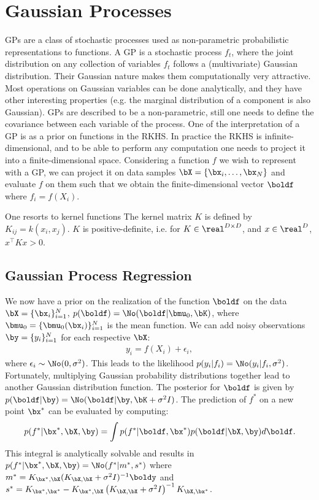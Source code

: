\section{Gaussian Processes}
\label{sec:gps}
\acf{GPs} are a class of stochastic processes used as non-parametric probabilistic representations to functions.
A \ac{GP} is a stochastic process $f_t$, where the joint distribution on any collection of variables $f_t$ follows a (multivariate) Gaussian distribution.
Their Gaussian nature makes them computationally very attractive.
Most operations on Gaussian variables can be done analytically, and they have other interesting properties (e.g. the marginal distribution of a component is also Gaussian). 
\ac{GPs} are described to be a non-parametric, still one needs to define the covariance between each variable of the process.
One of the interpretation of a \ac{GP} is as a prior on functions in the \acf{RKHS}.
In practice the \ac{RKHS} is infinite-dimensional, and to be able to perform any computation one needs to project it into a finite-dimensional space.
Considering a function $f$ we wish to represent with a \ac{GP}, we can project it on data samples $\bX = \{\bx_i, \ldots, \bx_N\}$ and evaluate $f$ on them such that we obtain the finite-dimensional vector $\boldf$ where $f_i = f(X_i)$.

One resorts to kernel functions %
The kernel matrix $K$ is defined by $K_{ij} = k(x_i, x_j)$.
$K$ is positive-definite, i.e. for $K\in \real^{D\times D}$, and $x\in \real^D$, $x^\top K x > 0$.

\subsection{Gaussian Process Regression}

We now have a prior on the realization of the function $\boldf$ on the data $\bX = \{\bx_i\}_{i=1}^N$, $p(\boldf) = \No(\boldf|\bmu_0, \bK)$, where $\bmu_0 = \{\bmu_0(\bx_i)\}_{i=1}^N$ is the mean function.
We can add noisy observations $\by = \{y_i\}_{i=1}^N$ for each respective $\bX$:
\begin{align}
y_i = f(X_i) + \epsilon_i,
\end{align}
where $\epsilon_i \sim \No(0,\sigma^2)$.
This leads to the likelihood $p(y_i|f_i) = \No(y_i|f_i, \sigma^2)$.
Fortunately, multiplying Gaussian probability distributions together lead to another Gaussian distribution function.
The posterior for $\boldf$ is given by $p(\boldf|\by) = \No(\boldf|\by, \bK + \sigma^2 I)$.
The prediction of $f^*$ on a new point $\bx^*$ can be evaluated by computing:
\begin{align}
p(f^*|\bx^*,\bX,\by) = \int p(f^*|\boldf,\bx^*)p(\boldf|\bX,\by)d\boldf.
\end{align}	
This integral is analytically solvable and results in $p(f^*|\bx^*,\bX,\by)=\No(f^*|m^*,s^*)$ where $m^* = K_{\bx^*,\bX}(K_{\bX,\bX} + \sigma^{2}I)^{-1}\boldy$ and $s^*=K_{\bx^*,\bx^*} - K_{\bx^*,\bX}\left(K_{\bX,\bX}+\sigma^2I\right)^{-1}K_{\bX,\bx^*}$.

